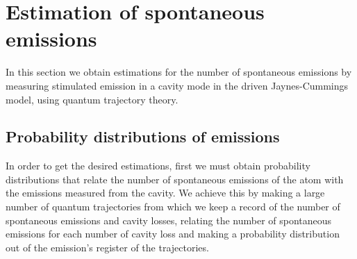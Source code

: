 \documentclass[conference]{IEEEtran}
\begin{document}
\section{Estimation of spontaneous emissions}
In this section we obtain estimations for the number of spontaneous emissions by measuring stimulated emission in a cavity mode in the driven Jaynes-Cummings model, using quantum trajectory theory.
\subsection{Probability distributions of emissions}
In order to get the desired estimations, first we must obtain probability distributions that relate the number of spontaneous emissions of the atom with the emissions measured from the cavity. We achieve this by making a large number of quantum  trajectories from which we keep a record of the number of spontaneous emissions and cavity losses, relating the number of spontaneous emissions for each number of cavity loss and making a probability distribution out of the emission's register of the trajectories. 
\end{document}

